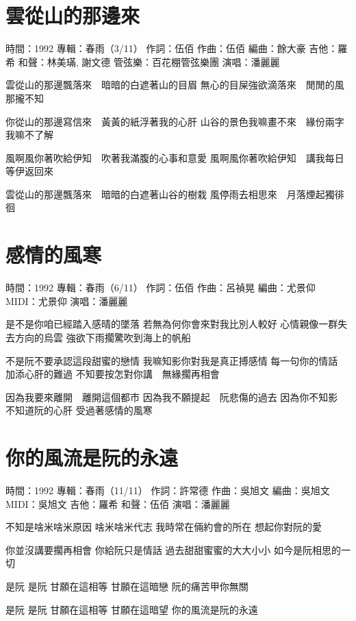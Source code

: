 \documentclass[UTF8,a4paper,oneside,twocolumn,12pt]{ctexbook}
\newcommand{\infopair}[2]{\textbullet #1：#2}
\newcommand{\zc}[1][伍佰]{\infopair{作詞}{#1}}
\newcommand{\zq}[1][伍佰]{\infopair{作曲}{#1}}
\newcommand{\bq}[1][伍佰]{\infopair{編曲}{#1}}
\newcommand{\zj}[1]{\infopair{專輯}{#1}}
\newcommand{\sj}[1]{\infopair{時間}{#1}}
\newenvironment{info}{\begin{flushleft}\kaishu
	}
	{\end{flushleft}\normalsize\yahei\par}
\newenvironment{lyric}{
	}
{}
\begin{document}
\section{雲從山的那邊來}
\begin{info}
	\sj{1992}
	\zj{春雨（3/11）}
	\zc
	\zq
	\bq[餘大豪]
	\infopair{吉他}{羅希}
	\infopair{和聲}{林美璊, 謝文德}
	\infopair{管弦樂}{百花棚管弦樂團}
	\infopair{演唱}{潘麗麗}
\end{info}
\begin{lyric}
	雲從山的那邊飄落來　暗暗的白遮著山的目眉
	無心的目屎強欲滴落來　閒閒的風那攏不知

	你從山的那邊寫信來　黃黃的紙浮著我的心肝
	山谷的景色我嘛畫不來　緣份兩字我嘛不了解

	風啊風你著吹給伊知　吹著我滿腹的心事和意愛
	風啊風你著吹給伊知　講我每日等伊返回來

	雲從山的那邊飄落來　暗暗的白遮著山谷的樹栽
	風停雨去相思來　月落煙起獨徘徊
\end{lyric}

\section{感情的風寒}
\begin{info}
	\sj{1992}
	\zj{春雨（6/11）}
	\zc
	\zq[呂禎晃]
	\bq[尤景仰]
	\infopair{MIDI}{尤景仰}
	\infopair{演唱}{潘麗麗}
\end{info}
\begin{lyric}
	是不是你咱已經踏入感晴的墜落
	若無為何你會來對我比別人較好
	心情親像一群失去方向的烏雲
	強欲下雨擱驚吹到海上的帆船

	不是阮不要承認這段甜蜜的戀情
	我嘛知影你對我是真正搏感情
	每一句你的情話　加添心肝的難過
	不知要按怎對你講　無緣擱再相會

	因為我要來離開　離開這個都市
	因為我不願提起　阮悲傷的過去
	因為你不知影　不知道阮的心肝
	受過著感情的風寒
\end{lyric}

\section{你的風流是阮的永遠}
\begin{info}
	\sj{1992}
	\zj{春雨（11/11）}
	\zc[許常德]
	\zq[吳旭文]
	\bq[吳旭文]
	\infopair{MIDI}{吳旭文}
	\infopair{吉他}{羅希}
	\infopair{和聲}{伍佰}
	\infopair{演唱}{潘麗麗}
\end{info}
\begin{lyric}
	不知是啥米啥米原因 啥米啥米代志
	我時常在倆約會的所在 想起你對阮的愛

	你並沒講要擱再相會 你給阮只是情話
	過去甜甜蜜蜜的大大小小 如今是阮相思的一切

	是阮 是阮 甘願在這相等 甘願在這暗戀
	阮的痛苦甲你無關

	是阮 是阮 甘願在這相等 甘願在這暗望
	你的風流是阮的永遠
\end{lyric}
\end{document}

